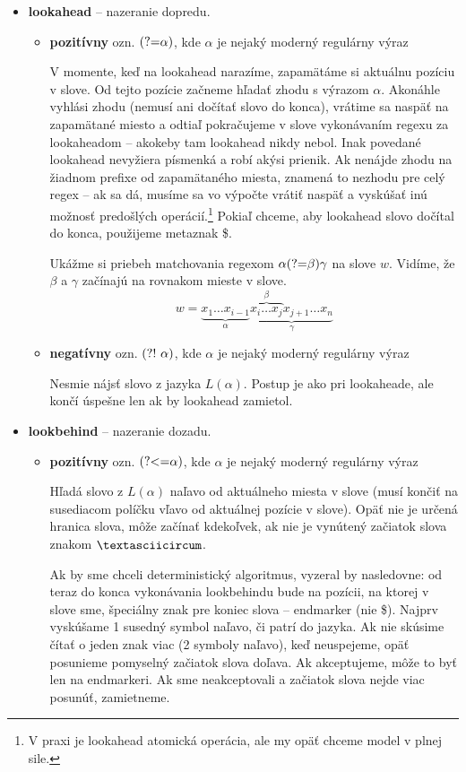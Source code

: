 \begin{itemize}
\item \textbf{lookahead} -- nazeranie dopredu.
\begin{itemize}
\item \textbf{pozitívny} ozn. $\text{(?=}\alpha)$, kde $\alpha$ je nejaký moderný regulárny výraz 

V momente, keď na lookahead narazíme, zapamätáme si aktuálnu pozíciu v slove. Od tejto pozície začneme hľadať zhodu s výrazom $\alpha$. Akonáhle vyhlási zhodu (nemusí ani dočítať slovo do konca), vrátime sa naspäť na zapamätané miesto a odtiaľ pokračujeme v slove vykonávaním regexu za lookaheadom -- akokeby tam lookahead nikdy nebol. Inak povedané lookahead nevyžiera písmenká a robí akýsi prienik. Ak nenájde zhodu na žiadnom prefixe od zapamätaného miesta, znamená to nezhodu pre celý regex -- ak sa dá, musíme sa vo výpočte vrátiť naspäť a vyskúšať inú možnosť predošlých operácií.\footnote{V praxi je lookahead atomická operácia, ale my opäť chceme model v plnej sile.} Pokiaľ chceme, aby lookahead slovo dočítal do konca, použijeme metaznak \$.

Ukážme si priebeh matchovania regexom $\alpha\text{(?=}\beta)\gamma$ na slove $w$. Vidíme, že $\beta$ a $\gamma$ začínajú na rovnakom mieste v slove.
 $$w = \underbrace{x_1\dots x_{i-1}}_\alpha \underbrace{\overbrace{x_i \dots x_j}^\beta x_{j+1} \dots x_n }_\gamma$$ 
\item \textbf{negatívny} ozn. $\text{(?!~}\alpha)$, kde $\alpha$ je nejaký moderný regulárny výraz  

Nesmie nájsť slovo z jazyka $L(\alpha)$. Postup je ako pri lookaheade, ale končí úspešne len ak by lookahead zamietol.
\end{itemize}
\item \textbf{lookbehind} -- nazeranie dozadu.
\begin{itemize}
\item \textbf{pozitívny} ozn. $\text{(?\textless =}\alpha)$, kde $\alpha$ je nejaký moderný regulárny výraz 

Hľadá slovo z $L(\alpha)$ naľavo od aktuálneho miesta v slove (musí končiť na susediacom políčku vľavo od aktuálnej pozície v slove). Opäť nie je určená hranica slova, môže začínať kdekoľvek, ak nie je vynútený začiatok slova znakom $\textasciicircum$. 

Ak by sme chceli deterministický algoritmus, vyzeral by nasledovne: od teraz do konca vykonávania lookbehindu bude na pozícii, na ktorej v slove sme, špeciálny znak pre koniec slova -- endmarker (nie \$). Najprv vyskúšame 1 susedný symbol naľavo, či patrí do jazyka. Ak nie skúsime čítať o jeden znak viac (2 symboly naľavo), keď neuspejeme, opäť posunieme pomyselný začiatok slova doľava. Ak akceptujeme, môže to byť len na endmarkeri. Ak sme neakceptovali a začiatok slova nejde viac posunúť, zamietneme.


\end{itemize}
\end{itemize}

